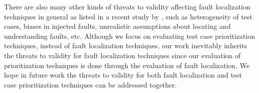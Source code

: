 
There are also many other kinds of threats to validity affecting fault localization techniques in general as listed in a recent study by \cite{Steimann2013}, such as heterogeneity of test cases, biases in injected faults, unrealistic assumptions about locating and understanding faults, etc. Although we focus on evaluating test case prioritization techniques, instead of fault localization techniques, our work inevitably inherits the threats to validity for fault localization techniques since our evaluation of prioritization techniques is done through the evaluation of fault localization. We hope in future work the threats to validity for both fault localization and test case prioritization techniques can be addressed together.
